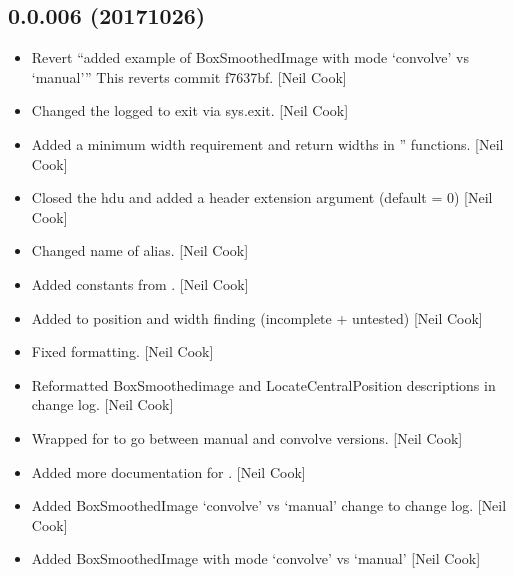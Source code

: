 \documentclass[a4paper,10pt,english]{report}
\begin{document}
\subsection{0.0.006 (2017\sphinxhyphen{}10\sphinxhyphen{}26)}
\label{\detokenize{misc/changelog:id563}}\begin{itemize}
\item {} 
Revert “added example of BoxSmoothedImage with mode ‘convolve’ vs
‘manual’” This reverts commit f7637bf. {[}Neil Cook{]}

\item {} 
Changed the logged to exit via sys.exit. {[}Neil Cook{]}

\item {} 
Added a minimum width requirement and return widths in
” functions. {[}Neil Cook{]}

\item {} 
Closed the hdu and added a header extension argument (default = 0)
{[}Neil Cook{]}

\item {} 
Changed name of  alias. {[}Neil Cook{]}

\item {} 
Added constants from . {[}Neil Cook{]}

\item {} 
Added to position and width finding (incomplete + untested) {[}Neil
Cook{]}

\item {} 
Fixed formatting. {[}Neil Cook{]}

\item {} 
Reformatted BoxSmoothedimage and LocateCentralPosition descriptions in
change log. {[}Neil Cook{]}

\item {} 
Wrapped for  to go between manual and convolve
versions. {[}Neil Cook{]}

\item {} 
Added more documentation for . {[}Neil Cook{]}

\item {} 
Added BoxSmoothedImage ‘convolve’ vs ‘manual’ change to change log.
{[}Neil Cook{]}

\item {} 
Added BoxSmoothedImage with mode ‘convolve’ vs ‘manual’ {[}Neil Cook{]}

\end{itemize}
\end{document}
